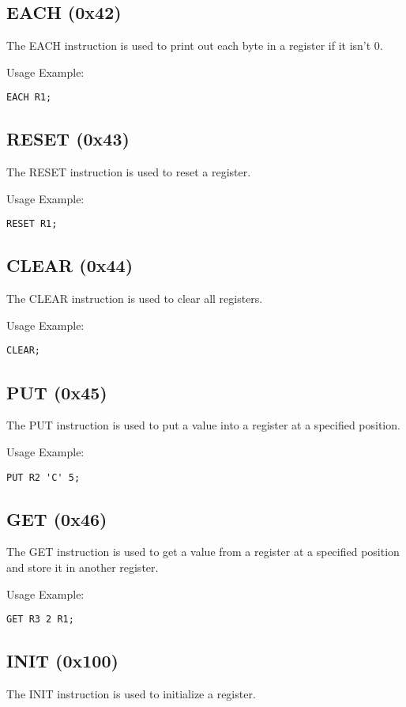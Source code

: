\documentclass{article}
\begin{document}
\subsection{EACH (0x42)}
The EACH instruction is used to print out each byte in a register if it isn't 0.

Usage Example:
\begin{verbatim}
EACH R1;
\end{verbatim}

\subsection{RESET (0x43)}
The RESET instruction is used to reset a register.

Usage Example:
\begin{verbatim}
RESET R1;
\end{verbatim}

\subsection{CLEAR (0x44)}
The CLEAR instruction is used to clear all registers.

Usage Example:
\begin{verbatim}
CLEAR;
\end{verbatim}

\subsection{PUT (0x45)}
The PUT instruction is used to put a value into a register at a specified position.

Usage Example:
\begin{verbatim}
PUT R2 'C' 5;
\end{verbatim}

\subsection{GET (0x46)}
The GET instruction is used to get a value from a register at a specified position and store it in another register.

Usage Example:
\begin{verbatim}
GET R3 2 R1;
\end{verbatim}

\subsection{INIT (0x100)}
The INIT instruction is used to initialize a register.
\end{document}
